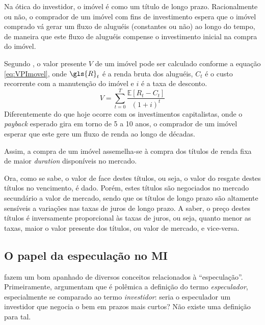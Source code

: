 \documentclass[
	12pt,				%
	oneside,			%
	a4paper,			%
	chapter=TITLE,		%
	section=TITLE,		%
	english,			%
	brazil				%
	]{abntex2}
\begin{document}
Na ótica do investidor, o imóvel é como um título de longo prazo. Racionalmente
ou não, o comprador de um imóvel com fins de investimento espera que o imóvel
comprado vá gerar um fluxo de aluguéis (constantes ou não) ao longo do tempo, de
maneira que este fluxo de aluguéis compense o investimento inicial na compra do
imóvel.

Segundo \textcite[p.~4]{Malpezzi2002TheRO}, o valor presente \(V\) de um imóvel pode ser
calculado conforme a equação \eqref{eq:VPImovel}, onde \(\gls{R}_t\) é a renda
bruta dos aluguéis, \(C_t\) é o custo recorrente com a manutenção do imóvel e \(i\)
é a taxa de desconto.
\begin{equation}
V = \sum_{t=0}^T \frac{\mathbb{E}[R_t-C_t]}{(1+i)^t}
\label{eq:VPImovel}
\end{equation}
Diferentemente do que hoje ocorre com os investimentos capitalistas, onde o
\emph{payback} esperado gira em torno de 5 a 10 anos, o comprador de um imóvel
esperar que este gere um fluxo de renda ao longo de décadas.

Assim, a compra de um imóvel assemelha-se à compra dos títulos de renda fixa de
maior \emph{duration} disponíveis no mercado.

Ora, como se sabe, o valor de face destes títulos, ou seja, o valor do resgate
destes títulos no vencimento, é dado. Porém, estes títulos são negociados no
mercado secundário a valor de mercado, sendo que os títulos de longo prazo são
altamente sensíveis a variações nas taxas de juros de longo prazo. A saber, o
preço destes títulos é inversamente proporcional às taxas de juros, ou seja,
quanto menor as taxas, maior o valor presente dos títulos, ou valor de mercado,
e vice-versa.

\hypertarget{o-papel-da-especulauxe7uxe3o-no}{%
\subsection{\texorpdfstring{O papel da especulação no \gls{MI}}{O papel da especulação no }}\label{o-papel-da-especulauxe7uxe3o-no}}

\textcite[p.~5]{Malpezzi2002TheRO} fazem um bom apanhado de diversos conceitos relacionados à
``especulação''. Primeiramente, argumentam que é polêmica a definição do termo
\emph{especulador}, especialmente se comparado ao termo \emph{investidor}: seria o
especulador um investidor que negocia o bem em prazos mais curtos? Não existe
uma definição para tal.
\end{document}
